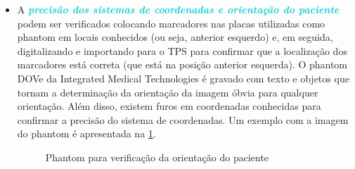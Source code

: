 \documentclass[11pt,a4paper]{article}
\newcounter{exemplo}
\begin{document}
\begin{itemize}[label=\textcolor{CarnationPink}{$\star$}]
		\item A \textcolor{DarkTurquoise}{\textbf{\textit{precisão dos sistemas de coordenadas e orientação do paciente}}} podem ser verificados colocando marcadores nas placas utilizadas como phantom em locais conhecidos (ou seja, anterior esquerdo) e, em seguida, digitalizando e importando para o TPS para confirmar que a localização dos marcadores está correta (que está na posição anterior esquerda). O phantom DOVe da Integrated Medical Technologies é gravado com texto e objetos que tornam a determinação da orientação da imagem óbvia para qualquer orientação. Além disso, existem furos em coordenadas conhecidas para confirmar a precisão do sistema de coordenadas. Um exemplo com a imagem do phantom é apresentada na \ref{fig:phantomOrientacaoPaciente}.
		
		\begin{figure}[!h]
			\centering
			\caption{Phantom para verificação da orientação do paciente}
			\label{fig:phantomOrientacaoPaciente}
		\end{figure}
	

\end{itemize}
\end{document}
